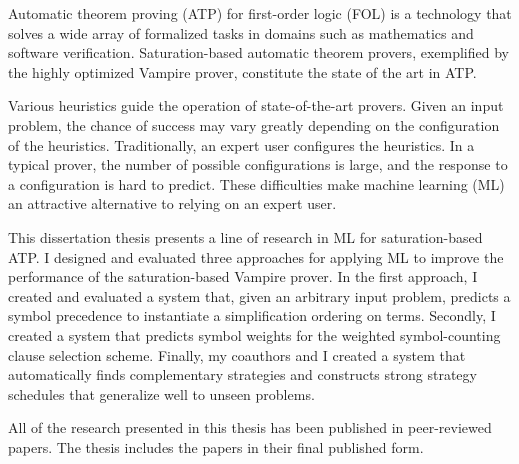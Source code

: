 Automatic theorem proving (ATP) for first-order logic (FOL) is a technology that solves a wide array of formalized tasks in domains such as mathematics and software verification.
Saturation-based automatic theorem provers, exemplified by the highly optimized Vampire prover, constitute the state of the art in ATP.

Various heuristics guide the operation of state-of-the-art provers.
Given an input problem, the chance of success may vary greatly depending on the configuration of the heuristics.
Traditionally, an expert user configures the heuristics.
In a typical prover, the number of possible configurations is large, and the response to a configuration is hard to predict.
These difficulties make machine learning (ML) an attractive alternative to relying on an expert user.

This dissertation thesis presents a line of research in ML for saturation-based ATP.
I designed and evaluated three approaches for applying ML to improve the performance of the saturation-based Vampire prover.
In the first approach, I created and evaluated a system that, given an arbitrary input problem, predicts a symbol precedence to instantiate a simplification ordering on terms.
Secondly, I created a system that predicts symbol weights for the weighted symbol-counting clause selection scheme.
Finally, my coauthors and I created a system that automatically finds complementary strategies and constructs strong strategy schedules that generalize well to unseen problems.

All of the research presented in this thesis has been published in peer-reviewed papers.
The thesis includes the papers in their final published form.
